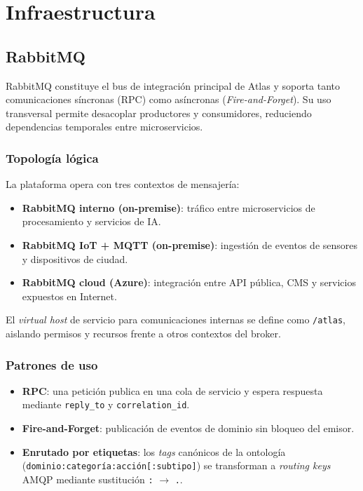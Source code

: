 \chapter{Infraestructura}
\label{cap:infraestructura}

\section{RabbitMQ}

RabbitMQ constituye el bus de integración principal de Atlas y soporta tanto comunicaciones síncronas (RPC) como asíncronas (\textit{Fire-and-Forget}). Su uso transversal permite desacoplar productores y consumidores, reduciendo dependencias temporales entre microservicios.

\subsection*{Topología lógica}

La plataforma opera con tres contextos de mensajería:

\begin{itemize}
\item \textbf{RabbitMQ interno (on-premise)}: tráfico entre microservicios de procesamiento y servicios de IA.
\item \textbf{RabbitMQ IoT + MQTT (on-premise)}: ingestión de eventos de sensores y dispositivos de ciudad.
\item \textbf{RabbitMQ cloud (Azure)}: integración entre API pública, CMS y servicios expuestos en Internet.
\end{itemize}

El \textit{virtual host} de servicio para comunicaciones internas se define como \texttt{/atlas}, aislando permisos y recursos frente a otros contextos del broker.

\subsection*{Patrones de uso}

\begin{itemize}
\item \textbf{RPC}: una petición publica en una cola de servicio y espera respuesta mediante \texttt{reply\_to} y \texttt{correlation\_id}.
\item \textbf{Fire-and-Forget}: publicación de eventos de dominio sin bloqueo del emisor.
\item \textbf{Enrutado por etiquetas}: los \textit{tags} canónicos de la ontología (\texttt{dominio:categoría:acción[:subtipo]}) se transforman a \textit{routing keys} AMQP mediante sustitución \texttt{:} $\rightarrow$ \texttt{.}.
\end{itemize}

